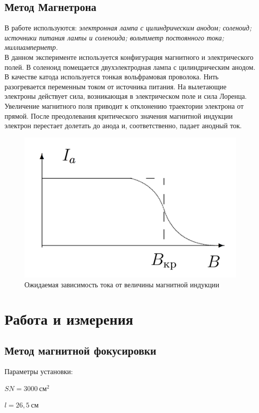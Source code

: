 \documentclass[a4paper, 12pt]{article}
\begin{document}
\subsection*{Метод Магнетрона}

В работе используются: \textit{электронная лампа с цилиндрическим анодом; соленоид; источники питания лампы и соленоида; вольтметр постоянного тока; миллиамперметр.}\\[0.5cm]
В данном эксперименте используется конфигурация магнитного и электрического полей. В соленоид помещается двухэлектродная лампа с цилиндрическим анодом. В качестве катода используется тонкая вольфрамовая проволока. Нить разогревается переменным током от источника питания. На вылетающие электроны действует сила, возникающая в электрическом поле и сила Лоренца. Увеличение магнитного поля приводит к отклонению траектории электрона от прямой. После преодолевания критического значения магнитной индукции электрон перестает долетать до анода и, соответственно, падает анодный ток.

\begin{figure}[H]
\centering
	 \includegraphics[width = 80 mm]{expected.png}
\caption{Ожидаемая зависимость тока от величины магнитной индукции}
\label {img:expected}
\end{figure}



\section{Работа и измерения}
\subsection*{Метод магнитной фокусировки}
Параметры установки: 

$SN = 3000 \: \text{см}^2$

$l = 26,5 \: \text{см}$
\end{document}
